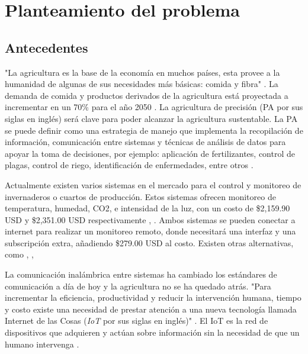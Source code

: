 \section{Planteamiento del problema}

\subsection{Antecedentes}

"La agricultura es la base de la economía en muchos países, esta provee a la humanidad de algunas de sus necesidades más básicas: comida y fibra" \cite{appsremotesensing}. 
La demanda de comida y productos derivados de la agricultura está proyectada a incrementar en un 70\% para el año 2050 \cite{wik_pingali_brocai_2008}. 
La agricultura de precisión (PA por sus siglas en inglés) será clave para poder alcanzar la agricultura sustentable. La PA se puede definir como una 
estrategia de manejo que implementa la recopilación de información, comunicación entre sistemas y técnicas de análisis de datos para apoyar la toma 
de decisiones, por ejemplo: aplicación de fertilizantes, control de plagas, control de riego, identificación de enfermedades, entre otros \cite{appsremotesensing}.

Actualmente existen varios sistemas en el mercado para el control y monitoreo de invernaderos o cuartos de producción. Estos sistemas ofrecen monitoreo de temperatura, humedad, CO2, 
e intensidad de la luz, con un costo de \$2,159.90 USD y \$2,351.00 USD respectivamente \cite{intellidose_kit_2021}, \cite{smartbee_kit_2021}. Ambos sistemas se pueden conectar 
a internet para realizar un monitoreo remoto, donde \cite{intellidose_kit_2021} necesitará una interfaz y una subscripción extra, añadiendo \$279.00 USD al costo. Existen otras 
alternativas, como \cite{ceres_greenhouse_solutions_2021}, \cite{autogrow_climate_control_2021}, \cite{climate_control_2021} 

La comunicación inalámbrica entre sistemas ha cambiado los estándares de comunicación a día de hoy y la agricultura no se ha quedado atrás. 
"Para incrementar la eficiencia, productividad y reducir la intervención humana, tiempo y costo existe una necesidad de prestar atención a una
nueva tecnología llamada Internet de las Cosas (\textit{IoT} por sus siglas en inglés)" \cite{agriculture_automation_review}. El IoT es la red de dispositivos 
que adquieren y actúan sobre información sin la necesidad de que un humano intervenga \cite{agriculture_automation_review}. 

